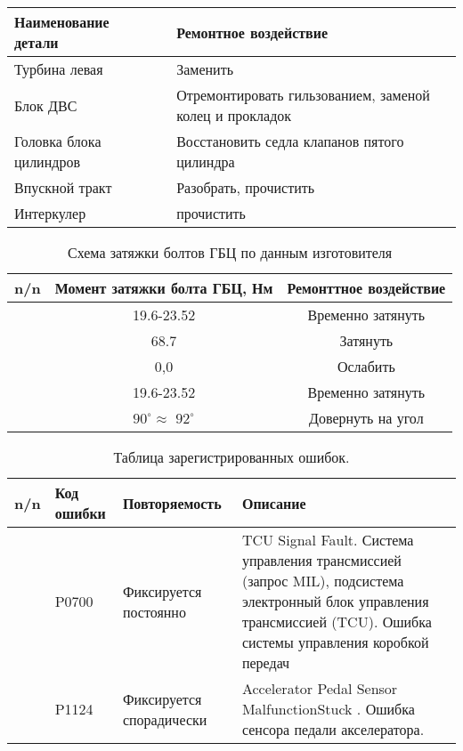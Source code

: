 \begin{center}
	\begin{tabulary}{\textwidth}{LCL}
\hline 
\textbf{Наименование детали}      &   & \textbf{Ремонтное воздействие}\\
\hline    
Турбина левая     &   &    Заменить\\
Блок ДВС    &   &    Отремонтировать гильзованием, заменой колец и прокладок \\
Головка блока цилиндров & & Восстановить седла клапанов пятого цилиндра \\
Впускной тракт & &    Разобрать, прочистить\\
Интеркулер   & &     прочистить\\
 

	\end{tabulary}  
\end{center}



\begin{table}[H]
	{\small \begin{tabular}{c|c|c}
			\hline
			\textbf{n/n } & {\textbf{Момент затяжки болта ГБЦ, Нм}} & \textbf{Ремонттное воздействие} \\
			\hline
			\Rownum & 19.6-23.52 & Временно затянуть \\
			\hline
			\Rownum & 68.7 & Затянуть \\
			\hline
			\Rownum & 0,0 & Ослабить \\
			\hline
			\Rownum & 19.6-23.52 & Временно затянуть \\
			\hline
			\Rownum & $90^{\circ}$$  \approx $ $92^{\circ}$ & Довернуть на угол \\
			\hline
	\end{tabular}}
	\caption{Схема затяжки болтов ГБЦ по данным изготовителя}
	\label{схемазатяжки}
\end{table}\setcounter{rownum}{0}



\begin{table}[h]
	\caption{Таблица зарегистрированных ошибок.}
	\label{table:ошибки}
	\begin{tabular}{c|m{45mm}|m{35mm}|m{63mm}}\hline
		\textbf{  n/n} & \textbf{Код ошибки} & \textbf{Повторяемость} & \textbf{Описание} \\
		\hline 
		\Rownum & P0700 & Фиксируется постоянно & TCU Signal Fault. Система управления трансмиссией (запрос MIL), подсистема электронный блок управления трансмиссией (TCU). Ошибка системы управления коробкой передач \\
		\hline
		\Rownum & P1124 & Фиксируется спорадически & Accelerator Pedal Sensor MalfunctionStuck . Ошибка сенсора педали акселератора.\\ \hline
	\end{tabular}
\end{table}\setcounter{rownum}{0}



